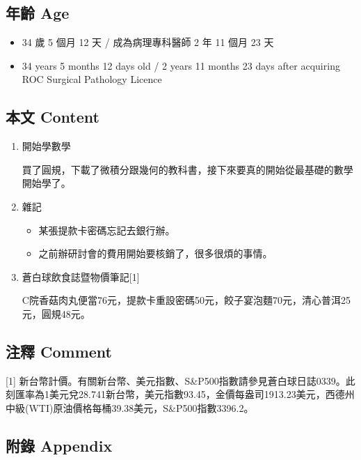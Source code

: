 \documentclass[
]{article}
\providecommand{\tightlist}{%
  \setlength{\itemsep}{0pt}\setlength{\parskip}{0pt}}
\begin{document}
\hypertarget{ux5e74ux9f61-age-4}{%
\subsection{年齡 Age}\label{ux5e74ux9f61-age-4}}

\begin{itemize}
\tightlist
\item
  34 歲 5 個月 12 天 / 成為病理專科醫師 2 年 11 個月 23 天
\item
  34 years 5 months 12 days old / 2 years 11 months 23 days after
  acquiring ROC Surgical Pathology Licence
\end{itemize}

\hypertarget{ux672cux6587-content-4}{%
\subsection{本文 Content}\label{ux672cux6587-content-4}}

\begin{enumerate}
\def\labelenumi{\arabic{enumi}.}
\item
  開始學數學

  買了圓規，下載了微積分跟幾何的教科書，接下來要真的開始從最基礎的數學開始學了。
\item
  雜記

  \begin{itemize}
  \tightlist
  \item
    某張提款卡密碼忘記去銀行辦。
  \item
    之前辦研討會的費用開始要核銷了，很多很煩的事情。
  \end{itemize}
\item
  蒼白球飲食誌暨物價筆記{[}1{]}

  C院香菇肉丸便當76元，提款卡重設密碼50元，餃子宴泡麵70元，清心普洱25元，圓規48元。
\end{enumerate}

\hypertarget{ux6ce8ux91cb-comment-4}{%
\subsection{注釋 Comment}\label{ux6ce8ux91cb-comment-4}}

{[}1{]}
新台幣計價。有關新台幣、美元指數、S\&P500指數請參見蒼白球日誌0339。此刻匯率為1美元兌28.741新台幣，美元指數93.45，金價每盎司1913.23美元，西德州中級(WTI)原油價格每桶39.38美元，S\&P500指數3396.2。

\hypertarget{ux9644ux9304-appendix-4}{%
\subsection{附錄 Appendix}\label{ux9644ux9304-appendix-4}}
\end{document}
